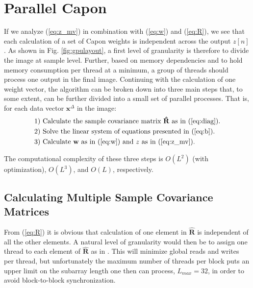\documentclass[conference]{IEEEtran}
\newcommand{\mat}[1]{\mathbf{#1}}
\renewcommand{\vec}[1]{\mathbf{#1}}
\begin{document}
\section{Parallel Capon}\label{sec:meth}
If we analyze (\ref{eq:z_mv}) in combination with (\ref{eq:w}) and (\ref{eq:R}), we see that each calculation of a set of Capon weights is independent across the output $z[n]$. As shown in Fig. \ref{fig:gpulayout}, a first level of granularity is therefore to divide the image at sample level.  Further, based on memory dependencies and to hold memory consumption per thread at a minimum, a group of threads should process one output in the final image. Continuing with the calculation of one weight vector, the algorithm can be broken down into three main steps that, to some extent, can be further divided into a small set of parallel processes. That is, for each data vector $\vec{x}^\Delta$ in the image:
\begin{align*}
\text{1) } &\text{Calculate the sample covariance matrix } \mat{\hat{R}} \text{ as in } \text{(\ref{eq:diag})}.\\
\text{2) } &\text{Solve the linear system of equations presented in (\ref{eq:b})}.\\
\text{3) } &\text{Calculate } \vec{w} \text{ as in (\ref{eq:w}) and } z \text{ as in (\ref{eq:z_mv}).}
\end{align*}

The computational complexity of these three steps is $O(L^2)$ (with optimization), $O(L^3)$, and $O(L)$, respectively.

\subsection{Calculating Multiple Sample Covariance Matrices}

From (\ref{eq:R}) it is obvious that calculation of one element in $\mat{\hat{R}}$ is independent of all the other elements. A natural level of granularity would then be to assign one thread to each element of $\mat{\hat{R}}$ as in \cite{Chen2011}. This will minimize global reads and writes per thread, but unfortunately the maximum number of threads per block puts an upper limit on the subarray length one then can process, $L_{max}=32$, in order to avoid block-to-block synchronization.
\end{document}
